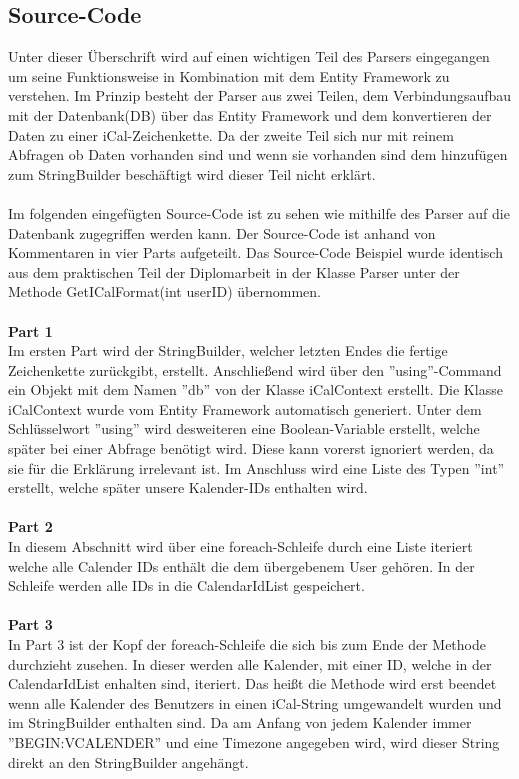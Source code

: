 \subsection{Source-Code}
\label{sec:parser-sourcecode}
Unter dieser Überschrift wird auf einen wichtigen Teil des Parsers eingegangen um seine Funktionsweise in Kombination mit dem Entity Framework zu verstehen. Im Prinzip besteht der Parser aus zwei Teilen, dem Verbindungsaufbau mit der Datenbank(DB) über das Entity Framework und dem konvertieren der Daten zu einer iCal-Zeichenkette. Da der zweite Teil sich nur mit reinem Abfragen ob Daten vorhanden sind und wenn sie vorhanden sind dem hinzufügen zum StringBuilder beschäftigt wird dieser Teil nicht erklärt.\\ \\
Im folgenden eingefügten Source-Code ist zu sehen wie mithilfe des Parser auf die Datenbank zugegriffen werden kann. Der Source-Code ist anhand von Kommentaren in vier Parts aufgeteilt. Das Source-Code Beispiel wurde identisch aus dem praktischen Teil der Diplomarbeit in der Klasse Parser unter der Methode GetICalFormat(int userID) übernommen. \\ \\
\textbf{Part 1} \\
Im ersten Part wird der StringBuilder, welcher letzten Endes die fertige Zeichenkette zurückgibt, erstellt. Anschließend wird über den ''using''-Command ein Objekt mit dem Namen ''db'' von der Klasse iCalContext erstellt. Die Klasse iCalContext wurde vom Entity Framework automatisch generiert. Unter dem Schlüsselwort ''using'' wird desweiteren eine Boolean-Variable erstellt, welche später bei einer Abfrage benötigt wird. Diese kann vorerst ignoriert werden, da sie für die Erklärung irrelevant ist. Im Anschluss wird eine Liste des Typen ''int'' erstellt, welche später unsere Kalender-IDs enthalten wird. \\ \\
\textbf{Part 2} \\
In diesem Abschnitt wird über eine foreach-Schleife durch eine Liste iteriert welche alle Calender IDs enthält die dem übergebenem User gehören. In der Schleife werden alle IDs in die CalendarIdList gespeichert. \\ \\
\textbf{Part 3} \\
In Part 3 ist der Kopf der foreach-Schleife die sich bis zum Ende der Methode durchzieht zusehen. In dieser werden alle Kalender, mit einer ID, welche in der CalendarIdList enhalten sind, iteriert. Das heißt die Methode wird erst beendet wenn alle Kalender des Benutzers in einen iCal-String umgewandelt wurden und im StringBuilder enthalten sind. Da am Anfang von jedem Kalender immer ''BEGIN:VCALENDER'' und eine Timezone angegeben wird, wird dieser String direkt an den StringBuilder angehängt. \\ \\
